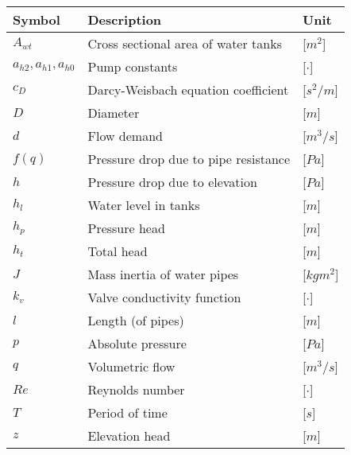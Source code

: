\begin{tabular}{l l l} 
	\textbf{Symbol}		&	\textbf{Description}								& \hspace{25mm}\textbf{Unit}	\\\hline

	$A_{wt}$ 			&	Cross sectional area of water tanks	 				& \hspace{25mm}[$m^2$]\\
	$a_{h2},a_{h1},a_{h0}$ &	Pump constants	 								& \hspace{25mm}[$\cdot$]\\
	$c_D$				&	Darcy-Weisbach equation coefficient	 				& \hspace{25mm}[$s^2/m$]\\
	$D$					&	Diameter 											& \hspace{25mm}[$m$]\\
	$d$					&	Flow demand	 										& \hspace{25mm}[$m^3/s$]\\
	$f(q)$				&	Pressure drop due to pipe resistance				& \hspace{25mm}[$Pa$]\\
	$h$					&	Pressure drop due to elevation					    & \hspace{25mm}[$Pa$]\\
	$h_{l}$				&	Water level in tanks							    & \hspace{25mm}[$m$]\\
	$h_p$				&	Pressure head									    & \hspace{25mm}[$m$]\\
	$h_t$				&	Total head									        & \hspace{25mm}[$m$]\\
	$J$					&	Mass inertia of water pipes							& \hspace{25mm}[$kgm^2$]\\
	$k_v$				&	Valve conductivity function							& \hspace{25mm}[$\cdot$]\\
	$l$					&	Length (of pipes)									& \hspace{25mm}[$m$]\\
	$p$					&	Absolute pressure									& \hspace{25mm}[$Pa$]\\
	$q$					&	Volumetric flow									    & \hspace{25mm}[$m^3/s$]\\
	$Re$				&	Reynolds number								        & \hspace{25mm}[$\cdot$]\\
	$T$					&	Period of time								        & \hspace{25mm}[$s$]\\
	$z$					&	Elevation head									    & \hspace{25mm}[$m$]\\


\end{tabular}
